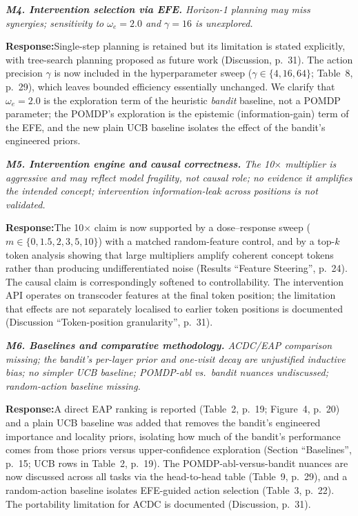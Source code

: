 \documentclass[11pt]{article}
\newenvironment{comment}{%
  \def\FrameCommand{{\color{commentrule}\vrule width 3pt}\hspace{0pt}%
    \fboxsep=8pt\colorbox{commentbg}}%
  \MakeFramed{\advance\hsize-\width\FrameRestore}%
  \itshape\small}{\endMakeFramed}
\newcommand{\response}{\par\smallskip\noindent\textbf{Response:}\;}
\begin{document}
\begin{comment}
\textbf{M4. Intervention selection via EFE.} Horizon-1 planning may miss
synergies; sensitivity to $\omega_e=2.0$ and $\gamma=16$ is unexplored.
\end{comment}
\response Single-step planning is retained but its limitation is stated explicitly,
with tree-search planning proposed as future work (Discussion, p.~31). The action
precision $\gamma$ is now included in the hyperparameter sweep
($\gamma\in\{4,16,64\}$; Table~8, p.~29), which leaves bounded efficiency
essentially unchanged. We clarify that $\omega_e=2.0$ is the exploration term of
the heuristic \emph{bandit} baseline, not a POMDP parameter; the POMDP's
exploration is the epistemic (information-gain) term of the EFE, and the new plain
UCB baseline isolates the effect of the bandit's engineered priors.

\begin{comment}
\textbf{M5. Intervention engine and causal correctness.} The 10$\times$ multiplier
is aggressive and may reflect model fragility, not causal role; no evidence it
amplifies the intended concept; intervention information-leak across positions is
not validated.
\end{comment}
\response The 10$\times$ claim is now supported by a dose--response sweep
($m\in\{0,1.5,2,3,5,10\}$) with a matched random-feature control, and by a top-$k$
token analysis showing that large multipliers amplify coherent concept tokens
rather than producing undifferentiated noise (Results ``Feature Steering'', p.~24).
The causal claim is correspondingly softened to controllability. The intervention
API operates on transcoder features at the final token position; the limitation
that effects are not separately localised to earlier token positions is documented
(Discussion ``Token-position granularity'', p.~31).

\begin{comment}
\textbf{M6. Baselines and comparative methodology.} ACDC/EAP comparison missing;
the bandit's per-layer prior and one-visit decay are unjustified inductive bias;
no simpler UCB baseline; POMDP-abl vs.\ bandit nuances undiscussed;
random-action baseline missing.
\end{comment}
\response A direct EAP ranking is reported (Table~2, p.~19; Figure~4, p.~20) and a
plain UCB baseline was added that removes the bandit's engineered importance and
locality priors, isolating how much of the bandit's performance comes from those
priors versus upper-confidence exploration (Section ``Baselines'', p.~15; UCB rows
in Table~2, p.~19). The POMDP-abl-versus-bandit nuances are now discussed across
all tasks via the head-to-head table (Table~9, p.~29), and a random-action
baseline isolates EFE-guided action selection (Table~3, p.~22). The portability
limitation for ACDC is documented (Discussion, p.~31).
\end{document}
